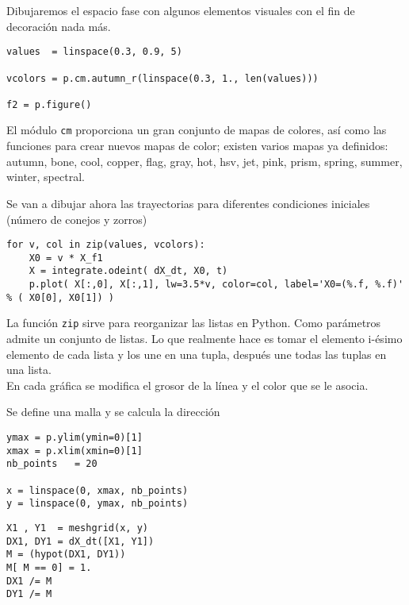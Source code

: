 \begin{frame}[fragile]
Dibujaremos el espacio fase con algunos elementos visuales con el fin de decoraci\'{o}n nada m\'{a}s.
\begin{lstlisting}
values  = linspace(0.3, 0.9, 5)                         

vcolors = p.cm.autumn_r(linspace(0.3, 1., len(values)))  

f2 = p.figure()
\end{lstlisting}
El m\'{o}dulo \texttt{cm} proporciona un gran conjunto de mapas de colores, as\'{i} como las funciones para crear nuevos mapas de color; existen varios mapas ya definidos: autumn, bone, cool, copper, flag, gray, hot, hsv, jet, pink, prism, spring, summer, winter, spectral.
\end{frame}
\begin{frame}[fragile]
Se van a dibujar ahora las trayectorias para diferentes condiciones iniciales (n\'{u}mero de conejos y zorros)
\begin{lstlisting}
for v, col in zip(values, vcolors):
    X0 = v * X_f1
    X = integrate.odeint( dX_dt, X0, t)
    p.plot( X[:,0], X[:,1], lw=3.5*v, color=col, label='X0=(%.f, %.f)' % ( X0[0], X0[1]) )
\end{lstlisting}
La funci\'{o}n \texttt{zip} sirve para reorganizar las listas en Python. Como par\'{a}metros admite un conjunto de listas. Lo que realmente hace es tomar el elemento i-\'{e}simo elemento de cada lista y los une en una tupla, despu\'{e}s une todas las tuplas en una lista.
\\
\medskip
En cada gr\'{a}fica se modifica el grosor de la l\'{i}nea y el color que se le asocia.
\end{frame}
\begin{frame}[fragile]
Se define una malla y se calcula la direcci\'{o}n
\begin{lstlisting}
ymax = p.ylim(ymin=0)[1]                        
xmax = p.xlim(xmin=0)[1]
nb_points   = 20
 
x = linspace(0, xmax, nb_points)
y = linspace(0, ymax, nb_points)
\end{lstlisting}
\end{frame}
\begin{frame}[fragile]
\begin{lstlisting}
X1 , Y1  = meshgrid(x, y)                       
DX1, DY1 = dX_dt([X1, Y1])                      
M = (hypot(DX1, DY1))                           
M[ M == 0] = 1.                                 
DX1 /= M                                        
DY1 /= M
\end{lstlisting}
\end{frame}
